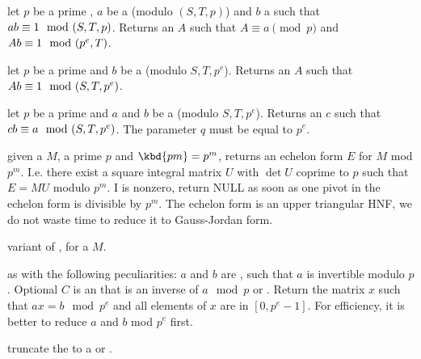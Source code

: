 




 let
$p$ be a prime , $a$ be a  (modulo $(S, T, p)$) and
$b$ a  such that $a\*b \equiv 1 \mod (S, T, p)$.
Returns an  $A$ such that $A \equiv a \pmod{p}$ and
$A\*b \equiv 1 \mod (p^e, T)$.

 let
$p$ be a prime  and $b$ be a  (modulo $S, T, p^e$).
Returns an  $A$ such that $A\*b \equiv 1 \mod (S, T, p^e)$.

 let
$p$ be a prime  and $a$ and $b$ be a  (modulo $S, T, p^e$).
Returns an  $c$ such that $c\*b \equiv a \mod (S, T, p^e)$.
The parameter $q$ must be equal to $p^e$.


 given a
 $M$, a prime $p$ and $\kbd{pm} = p^m$, returns an echelon form
$E$ for $M$ mod $p^m$. I.e. there exist a square integral matrix $U$ with
$\det U$ coprime to $p$ such that $E = MU$ modulo $p^m$. I
 is nonzero, return NULL as soon as one pivot in
the echelon form is divisible by $p^m$. The echelon form is an upper
triangular HNF, we do not waste time to reduce it to Gauss-Jordan form.

variant of , for a  $M$.

 as 
with the following peculiarities: $a$ and $b$ are , such that $a$ is
invertible modulo $p$. Optional $C$ is an  that is an inverse of
$a\mod p$ or . Return the matrix $x$ such that $ax=b\mod p^e$ and
all elements of $x$ are in $[0,p^e-1]$. For efficiency, it is better
to reduce $a$ and $b$ mod $p^e$ first.

 truncate the  to a  or
.

